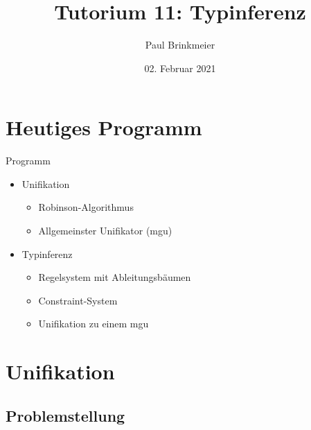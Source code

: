 \documentclass{beamer}
\title{Tutorium 11: Typinferenz}
\author{Paul Brinkmeier}
\institute{Tutorium Programmierparadigmen am KIT}
\date{02. Februar 2021}
\begin{document}
\begin{frame}
	\titlepage
\end{frame}

\section{Heutiges Programm}

\begin{frame}{Programm}
	\begin{itemize}
		\item Unifikation
                \begin{itemize}
                  \item Robinson-Algorithmus
                  \item Allgemeinster Unifikator (mgu)
                \end{itemize}
		\item Typinferenz
                \begin{itemize}
                  \item Regelsystem mit Ableitungsbäumen
                  \item Constraint-System
                  \item Unifikation zu einem mgu
                \end{itemize}
	\end{itemize}
\end{frame}

\section{Unifikation}

\subsection{Problemstellung}
\end{document}
